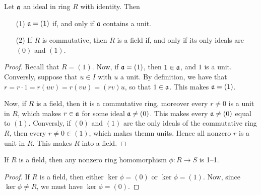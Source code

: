 \begin{lemma}\label{lemma_5.4.1}
  Let $\mathfrak{a}$ an ideal in ring $R$ with identity. Then
  \begin{enumerate}
    \item[(1)] $\mathfrak{a}=(1)$ if, and only if $\mathfrak{a}$ contains a unit.

    \item[(2)] If $R$ is commutative, then $R$ is a field if, and only if
      its only ideals are $(0)$ and $(1)$.
  \end{enumerate}
\end{lemma}
\begin{proof}
  Recall that $R=(1)$. Now, if $\mathfrak{a}=(1)$, then $1 \in \mathfrak{a}$, and  $1$ is a unit.
  Conversly, suppose that $u \in I$ with $u$ a unit. By definition, we have
  that  $r=r \cdot 1=r(uv)=r(vu)=(rv)u$, so that $1 \in \mathfrak{a}$. This makes
  $\mathfrak{a}=(1)$.

  Now, if $R$ is a field, then it is a commutative ring, moreover every  $r
  \neq 0$ is a unit in $R$, which makes $r \in \mathfrak{a}$ for some ideal
  $\mathfrak{a} \neq (0)$. This makes every $\mathfrak{a} \neq (0)$ equal to $(1)$. Conversly,
  if $(0)$ and $(1)$ are the only ideals of the commutative ring $R$, then
  every $r \neq 0 \in (1)$, which makes themn units. Hence all nonzero $r$ is a
  unit in $R$. This makes $R$ into a field.
\end{proof}
\begin{corollary}
  If $R$ is a field, then any nonzero ring homomorphism $\phi:R \xrightarrow{}
  S$ is 1--1.
\end{corollary}
\begin{proof}
  If $R$ is a field, then either $\ker{\phi}=(0)$ or $\ker{\phi}=(1)$. Now,
  since $\ker{\phi} \neq R$, we must have $\ker{\phi}=(0)$.
\end{proof}

